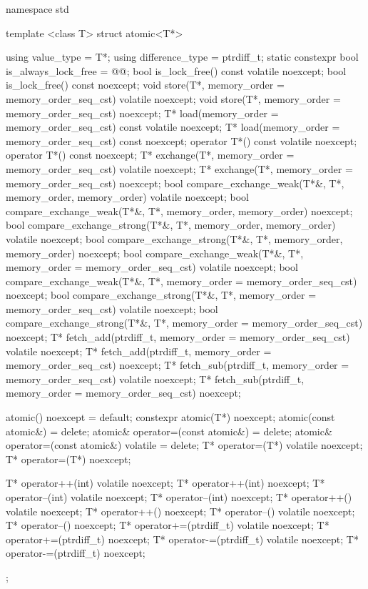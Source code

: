 \begin{codeblock}
namespace std {
  template <class T> struct atomic<T*> {
    using value_type = T*;
    using difference_type = ptrdiff_t;
    static constexpr bool is_always_lock_free = @@;
    bool is_lock_free() const volatile noexcept;
    bool is_lock_free() const noexcept;
    void store(T*, memory_order = memory_order_seq_cst) volatile noexcept;
    void store(T*, memory_order = memory_order_seq_cst) noexcept;
    T* load(memory_order = memory_order_seq_cst) const volatile noexcept;
    T* load(memory_order = memory_order_seq_cst) const noexcept;
    operator T*() const volatile noexcept;
    operator T*() const noexcept;
    T* exchange(T*, memory_order = memory_order_seq_cst) volatile noexcept;
    T* exchange(T*, memory_order = memory_order_seq_cst) noexcept;
    bool compare_exchange_weak(T*&, T*, memory_order, memory_order) volatile noexcept;
    bool compare_exchange_weak(T*&, T*, memory_order, memory_order) noexcept;
    bool compare_exchange_strong(T*&, T*, memory_order, memory_order) volatile noexcept;
    bool compare_exchange_strong(T*&, T*, memory_order, memory_order) noexcept;
    bool compare_exchange_weak(T*&, T*, memory_order = memory_order_seq_cst) volatile noexcept;
    bool compare_exchange_weak(T*&, T*, memory_order = memory_order_seq_cst) noexcept;
    bool compare_exchange_strong(T*&, T*, memory_order = memory_order_seq_cst) volatile noexcept;
    bool compare_exchange_strong(T*&, T*, memory_order = memory_order_seq_cst) noexcept;
    T* fetch_add(ptrdiff_t, memory_order = memory_order_seq_cst) volatile noexcept;
    T* fetch_add(ptrdiff_t, memory_order = memory_order_seq_cst) noexcept;
    T* fetch_sub(ptrdiff_t, memory_order = memory_order_seq_cst) volatile noexcept;
    T* fetch_sub(ptrdiff_t, memory_order = memory_order_seq_cst) noexcept;

    atomic() noexcept = default;
    constexpr atomic(T*) noexcept;
    atomic(const atomic&) = delete;
    atomic& operator=(const atomic&) = delete;
    atomic& operator=(const atomic&) volatile = delete;
    T* operator=(T*) volatile noexcept;
    T* operator=(T*) noexcept;

    T* operator++(int) volatile noexcept;
    T* operator++(int) noexcept;
    T* operator--(int) volatile noexcept;
    T* operator--(int) noexcept;
    T* operator++() volatile noexcept;
    T* operator++() noexcept;
    T* operator--() volatile noexcept;
    T* operator--() noexcept;
    T* operator+=(ptrdiff_t) volatile noexcept;
    T* operator+=(ptrdiff_t) noexcept;
    T* operator-=(ptrdiff_t) volatile noexcept;
    T* operator-=(ptrdiff_t) noexcept;
  };
}
\end{codeblock}

